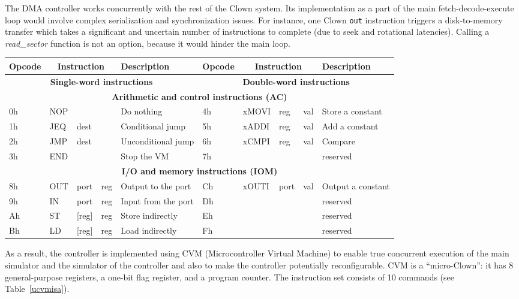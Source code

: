 \documentclass[10pt,twoside]{article}
\begin{document}
The DMA controller works concurrently with the rest of the Clown
system. Its implementation as a part of the main fetch-decode-execute
loop would involve complex serialization and synchronization
issues. For instance, one Clown {\tt out} instruction triggers a
disk-to-memory transfer which takes a significant and uncertain number
of instructions to complete (due to seek and rotational
latencies). Calling a {\em read\_sector} function is not an option,
because it would hinder the main loop.

\begin{table*}[tb!]\centering
\caption{\label{ucvmisa}CVM Instruction Set}
\baselineskip
\begin{tabular}{|l|lll|l||l|lll|l|}\hline
Opcode&\multicolumn{3}{|c|}{Instruction}&Description&
Opcode&\multicolumn{3}{|c|}{Instruction}&Description\\\hline
\multicolumn{5}{|c||}{\bf Single-word instructions}&
\multicolumn{5}{|c|}{\bf Double-word instructions}\\\hline
\multicolumn{10}{|c|}{\bf Arithmetic and control instructions (AC)}\\\hline
0h & NOP & && Do nothing & 4h & xMOVI & reg & val & Store a constant\\
1h & JEQ & dest & & Conditional jump& 5h&xADDI & reg & val & Add a constant\\
2h & JMP & dest & & Unconditional jump& 6h&xCMPI & reg & val & Compare\\
3h & END &  & & Stop the VM&7h&&&&reserved\\\hline
\multicolumn{10}{|c|}{\bf I/O and memory instructions (IOM)}\\\hline
8h & OUT & port&reg&Output to the port&Ch&xOUTI&port&val&Output a constant\\
9h & IN & port&reg&Input from the port&Dh&&&&reserved\\
Ah & ST & [reg]&reg&Store indirectly&Eh&&&&reserved\\
Bh & LD & [reg]&reg&Load indirectly&Fh&&&&reserved\\\hline
\end{tabular}
\end{table*}

As a result, the controller is implemented using CVM
(Microcontroller Virtual Machine) to enable true concurrent execution
of the main simulator and the simulator of the controller and also to
make the controller potentially reconfigurable. CVM is a
``micro-Clown'': it has 8 general-purpose registers, a one-bit flag
register, and a program counter. The instruction set consists of 10
commands (see Table~\ref{ucvmisa}).
\end{document}
